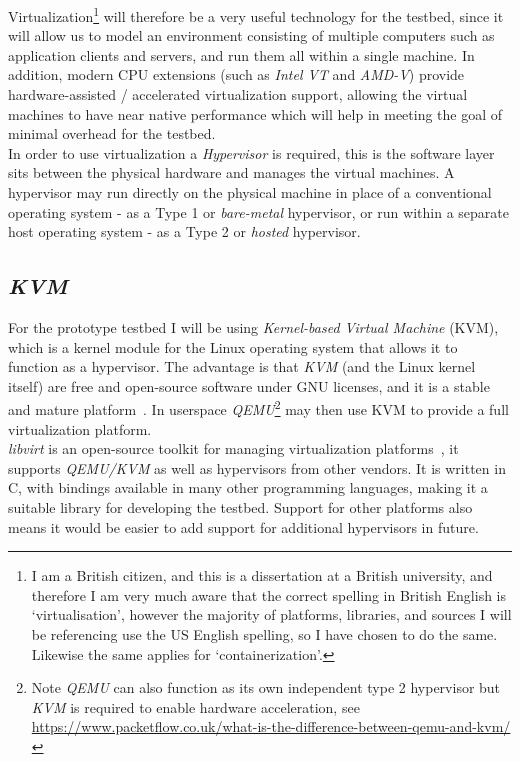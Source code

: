 \documentclass[
    author={Jacob Daniel Halsey},
    supervisor={Prof. Awais Rashid},
    degree={BSc},
    title={Building a Testbed for Evaluating Privacy Enhancing Technologies  (PETs)},
    subtitle={},
    type={software development},
    year={2021}
]{dissertation}
\begin{document}
Virtualization\footnote{I am a British citizen, and this is a dissertation at a British university, 
and therefore I am very much aware that the correct spelling in British English is `virtualisation', however the
majority of platforms, libraries, and sources I will be referencing use the US English spelling, 
so I have chosen to do the same. Likewise the same applies for `containerization'.}
 will therefore be a very useful technology for the testbed, since it will allow us to model
an environment consisting of multiple computers such as application clients and servers, and run
them all within a single machine. In addition, modern CPU extensions (such as \emph{Intel VT} and \emph{AMD-V}) 
provide hardware-assisted / accelerated virtualization support, allowing the virtual machines to 
have near native performance which will help in meeting the goal of minimal overhead for the testbed. \\

In order to use virtualization a \emph{Hypervisor} is required, this is the software layer sits between
the physical hardware and manages the virtual machines. A hypervisor may run directly on the physical machine
in place of a conventional operating system - as a Type 1 or \emph{bare-metal} hypervisor,
or run within a separate host operating system - as a Type 2 or \emph{hosted} hypervisor. \\

\subsection{\emph{KVM}}
\label{subsect:kvm}

For the prototype testbed I will be using \emph{Kernel-based Virtual Machine} (KVM), which is a 
kernel module for the Linux operating system that allows it to function as a hypervisor. 
The advantage is that \emph{KVM} (and the Linux kernel itself) are free and open-source software 
under GNU licenses, and it is a stable and mature platform~\cite{redhat_kvm}.
In userspace \emph{QEMU}\footnote{Note \emph{QEMU} can also function as its own independent type 2 hypervisor 
	but \emph{KVM} is required to enable hardware acceleration,
see \url{https://www.packetflow.co.uk/what-is-the-difference-between-qemu-and-kvm/}}
may then use KVM to provide a full virtualization platform. \\

\emph{libvirt} is an open-source toolkit for managing virtualization platforms~\cite{libvirt},
it supports \emph{QEMU/KVM} as well as hypervisors from other vendors. It is written in C, 
with bindings available in many other programming languages, making it a suitable library for developing 
the testbed. Support for other platforms also means it would be easier to add support
for additional hypervisors in future.
\end{document}
